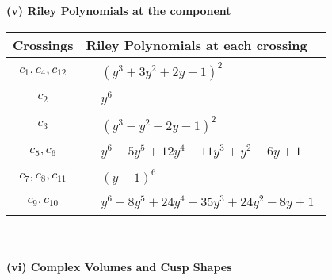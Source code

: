 \documentclass[1p]{elsarticle_modified}
\theoremstyle{definition}
\begin{document}
\newpage\renewcommand{\arraystretch}{1}
\flushleft \textbf{(v) Riley Polynomials at the component}\newline \\
\begin{tabular}{m{50pt}|m{274pt}}
Crossings & \hspace{64pt}Riley Polynomials at each crossing \\
\hline $$\begin{aligned}c_{1},c_{4},c_{12}\end{aligned}$$&$\begin{aligned}
&(y^3+3 y^2+2 y-1)^2
\end{aligned}$\\
\hline $$\begin{aligned}c_{2}\end{aligned}$$&$\begin{aligned}
&y^6
\end{aligned}$\\
\hline $$\begin{aligned}c_{3}\end{aligned}$$&$\begin{aligned}
&(y^3- y^2+2 y-1)^2
\end{aligned}$\\
\hline $$\begin{aligned}c_{5},c_{6}\end{aligned}$$&$\begin{aligned}
&y^6-5 y^5+12 y^4-11 y^3+y^2-6 y+1
\end{aligned}$\\
\hline $$\begin{aligned}c_{7},c_{8},c_{11}\end{aligned}$$&$\begin{aligned}
&(y-1)^6
\end{aligned}$\\
\hline $$\begin{aligned}c_{9},c_{10}\end{aligned}$$&$\begin{aligned}
&y^6-8 y^5+24 y^4-35 y^3+24 y^2-8 y+1
\end{aligned}$\\
\hline
\end{tabular}\\~\\
\newpage\flushleft \textbf{(vi) Complex Volumes and Cusp Shapes}
\end{document}
